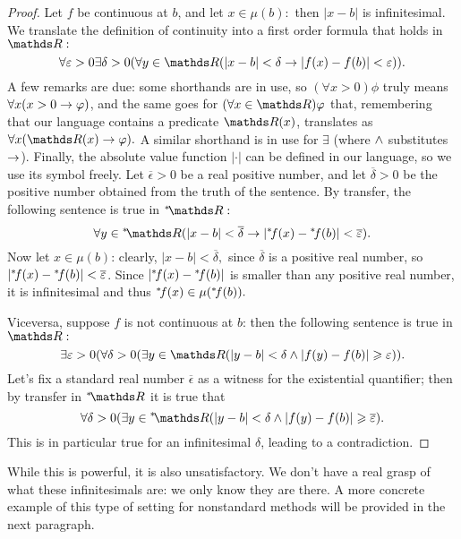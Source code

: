 \documentclass[draft.tex]{subfiles}
\begin{document}
\begin{proof}
Let $f$ be continuous at $b$, and let $x \in \mu(b):$ then $\vert x - b \vert$ is infinitesimal. We translate the definition of continuity into a first order formula that holds in $\RR:$
\begin{equation*}
    \forall \epsilon > 0 \exists \delta > 0(\forall y \in \RR(\vert x - b \vert < \delta \then \vert f(x) - f(b) \vert < \epsilon)).
\end{equation*}
A few remarks are due: some shorthands are in use, so $(\forall x > 0)\phi$ truly means $\forall x(x > 0 \rightarrow \varphi)$, and the same goes for $(\forall x \in \RR)\phi$ that, remembering that our language contains a predicate $\RR(x)$, translates as $\forall x(\RR(x) \then \phi).$ A similar shorthand is in use for $\exists$ (where $\land$ substitutes $\rightarrow$). Finally, the absolute value function $\vert \cdot \vert$ can be defined in our language, so we use its symbol freely. Let $\overline{\epsilon} > 0$ be a real positive number, and let $\overline{\delta} > 0$ be the positive number obtained from the truth of the sentence. By transfer, the following sentence is true in $\ns{\RR}:$
\begin{equation*}
    \forall y \in \ns{\RR}(\vert x - b \vert < \overline{\delta} \then \vert \ns{f}(x) - \ns{f}(b) \vert < \overline{\epsilon}).
\end{equation*}
Now let $x \in \mu(b)$: clearly, $\vert x - b \vert < \overline{\delta},$ since $\overline{\delta}$ is a positive real number, so $\vert {{}^{*}\!{f}}(x) - {{}^{*}\!{f}}(b) \vert < \overline{\varepsilon}$. Since $\vert {{}^{*}\!{f}}(x) - {{}^{*}\!{f}}(b) \vert$ is smaller than any positive real number, it is infinitesimal and thus ${{}^{*}\!{f}}(x) \in \mu({{}^{*}\!{f}}(b)).$
\par Viceversa, suppose $f$ is not continuous at $b$: then the following sentence is true in $\RR:$
\begin{equation*}
    \exists \epsilon > 0(\forall \delta > 0(\exists y \in \RR(\vert y - b \vert < \delta \meet \vert f(y) - f(b) \vert \geq \epsilon)).
\end{equation*}
Let's fix a standard real number $\overline{\epsilon}$ as a witness for the existential quantifier; then by transfer in $\ns{\RR}$ it is true that
\begin{equation*}
    \forall \delta > 0(\exists y \in \ns{\RR}(\vert y - b \vert < \delta \meet \vert f(y) - f(b) \vert \geq  \overline{\epsilon}).
\end{equation*}
This is in particular true for an infinitesimal $\delta$, leading to a contradiction.
\end{proof}
While this is powerful, it is also unsatisfactory. We don't have a real grasp of what these infinitesimals are: we only know they are there. A more concrete example of this type of setting for nonstandard methods will be provided in the next paragraph.
\end{document}
